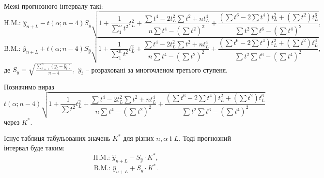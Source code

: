 \documentclass[a4paper, fontsize=10pt, oneside]{article}
\begin{document}
	Межі прогнозного інтервалу такі:
	\begin{equation*}
		\text{H.M.: } \hat y_{n+L} -t(\alpha; n-4) S_{\hat y} \sqrt{1 + \frac{1}{\sum_1^n t^2} t^2_L + \frac{\sum t^4 - 2 t^2_L \sum t^2 +n t^4_L}{n \sum t^4 - (\sum t^2)^2} + \frac{(\sum t^6 - 2 \sum t^4) t_L^2 + (\sum t^2) t_L^6}{\sum t^2 \sum t^6 - (\sum t^4)^2}},
	\end{equation*}
	\begin{equation*}
		\text{B.M.: } \hat y_{n+L} + t(\alpha; n-4) S_{\hat y} \sqrt{1 + \frac{1}{\sum_1^n t^2} t^2_L + \frac{\sum t^4 - 2 t^2_L \sum t^2 +n t^4_L}{n \sum t^4 - (\sum t^2)^2} + \frac{(\sum t^6 - 2 \sum t^4) t_L^2 + (\sum t^2) t_L^6}{\sum t^2 \sum t^6 - (\sum t^4)^2}},
	\end{equation*}
	де $S_{\hat y} = \sqrt{\frac{\sum_{t=1}^n (y_t - \hat y_t)}{n-4}},$ $\hat y_t$ -- розраховані за многочленом третього ступеня.
	
	Позначимо вираз
	\begin{equation*}
		t(\alpha; n-4) \sqrt{1 + \frac{1}{\sum t^2} t^2_L + \frac{\sum t^4 - 2 t^2_L \sum t^2 +n t^4_L}{n \sum t^4 - (\sum t^2)^2} + \frac{(\sum t^6 - 2 \sum t^4) t_L^2 + (\sum t^2) t_L^6}{\sum t^2 \sum t^6 - (\sum t^4)^2}}
	\end{equation*}
	через $K^*.$
	
	Існує таблиця табульованих значень $K^*$ для різних $n, \alpha$ і $L.$ Тоді прогнозний інтервал буде таким:
	\begin{equation*}
		\text{H.M.: } \hat y_{n+L} - S_{\hat y} \cdot K^*,
	\end{equation*}
	\begin{equation*}
		\text{B.M.: } \hat y_{n+L} + S_{\hat y} \cdot K^*.
	\end{equation*}
\end{document}
